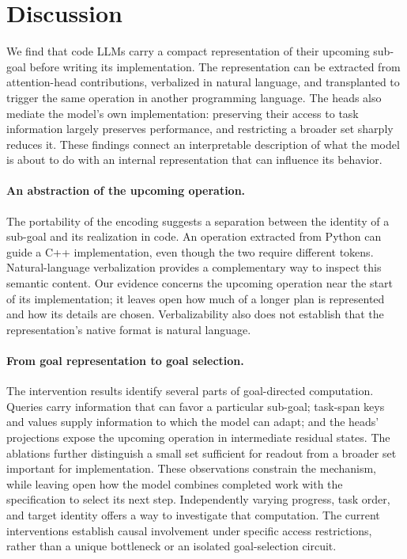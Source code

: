 \section{Discussion}
\label{sec:conclusion}

We find that code LLMs carry a compact representation of their upcoming sub-goal before writing its implementation. The representation can be extracted from attention-head contributions, verbalized in natural language, and transplanted to trigger the same operation in another programming language. The heads also mediate the model's own implementation: preserving their access to task information largely preserves performance, and restricting a broader set sharply reduces it. These findings connect an interpretable description of what the model is about to do with an internal representation that can influence its behavior.

\paragraph{An abstraction of the upcoming operation.}
The portability of the encoding suggests a separation between the identity of a sub-goal and its realization in code. An operation extracted from Python can guide a C++ implementation, even though the two require different tokens. Natural-language verbalization provides a complementary way to inspect this semantic content. Our evidence concerns the upcoming operation near the start of its implementation; it leaves open how much of a longer plan is represented and how its details are chosen. Verbalizability also does not establish that the representation's native format is natural language.

\paragraph{From goal representation to goal selection.}
\label{sec:mechanism:competence}
The intervention results identify several parts of goal-directed computation. Queries carry information that can favor a particular sub-goal; task-span keys and values supply information to which the model can adapt; and the heads' projections expose the upcoming operation in intermediate residual states. The ablations further distinguish a small set sufficient for readout from a broader set important for implementation. These observations constrain the mechanism, while leaving open how the model combines completed work with the specification to select its next step. Independently varying progress, task order, and target identity offers a way to investigate that computation. The current interventions establish causal involvement under specific access restrictions, rather than a unique bottleneck or an isolated goal-selection circuit.

